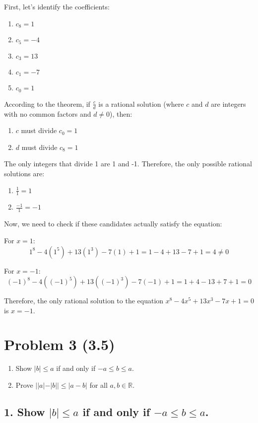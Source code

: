 \documentclass{article}
\begin{document}
First, let's identify the coefficients:
\begin{enumerate}
    \item $c_8 = 1$
    \item $c_5 = -4$
    \item $c_3 = 13$
    \item $c_1 = -7$
    \item $c_0 = 1$
\end{enumerate}

According to the theorem, if $\frac{c}{d}$ is a rational solution (where $c$ and $d$ are integers with no common factors and $d \neq 0$), then:
\begin{enumerate}
    \item $c$ must divide $c_0 = 1$
    \item $d$ must divide $c_8 = 1$
\end{enumerate}

The only integers that divide 1 are 1 and -1. Therefore, the only possible rational solutions are:
\begin{enumerate}
    \item $\frac{1}{1} = 1$
    \item $\frac{-1}{1} = -1$
\end{enumerate}

Now, we need to check if these candidates actually satisfy the equation:

For $x = 1$:
$$
1^8 - 4(1^5) + 13(1^3) - 7(1) + 1 = 1 - 4 + 13 - 7 + 1 = 4 \neq 0
$$

For $x = -1$:
$$
(-1)^8 - 4((-1)^5) + 13((-1)^3) - 7(-1) + 1 = 1 + 4 - 13 + 7 + 1 = 0
$$

Therefore, the only rational solution to the equation $x^8-4x^5+13x^3-7x+1=0$ is $x = -1$.

\section*{Problem 3 (3.5)}
\begin{enumerate}
    \item Show $|b|\leq a$ if and only if $-a\leq b\leq a$.
    \item Prove $||a|-|b||\leq|a-b|$ for all $a,b \in \mathbb{R}$.
\end{enumerate}

\subsection*{1. Show $|b|\leq a$ if and only if $-a\leq b\leq a$.}
\end{document}
